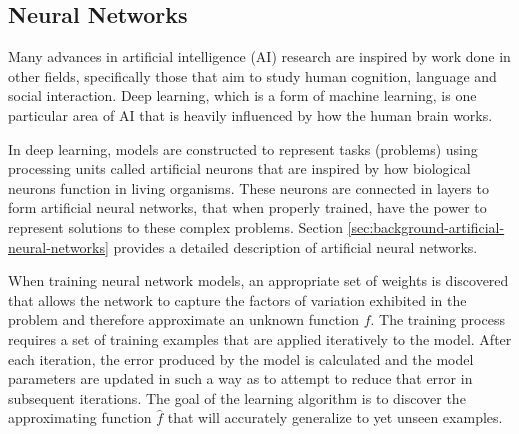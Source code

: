 \subsection{Neural Networks} \label{sec:introduction-introduction-machine-learning-neural-networks}

Many advances in artificial intelligence (AI) research are inspired by work done in other fields, specifically those that aim to study human cognition, language and social interaction\cite{DBLP:journals/corr/abs-1203-2990}. Deep learning, which is a form of machine learning, is one particular area of AI that is heavily influenced by how the human brain works.

In deep learning, models are constructed to represent tasks (problems) using processing units called artificial neurons that are inspired by how biological neurons function in living organisms. These neurons are connected in layers to form artificial neural networks, that when properly trained, have the power to represent solutions to these complex problems. Section \ref{sec:background-artificial-neural-networks} provides a detailed description of artificial neural networks.

When training neural network models, an appropriate set of weights is discovered that allows the network to capture the factors of variation exhibited in the problem and therefore approximate an unknown function $f$. The training process requires a set of training examples that are applied iteratively to the model. After each iteration, the error produced by the model is calculated and the model parameters are updated in such a way as to attempt to reduce that error in subsequent iterations. The goal of the learning algorithm is to discover the approximating function $\hat{f}$ that will accurately generalize to yet unseen examples.

